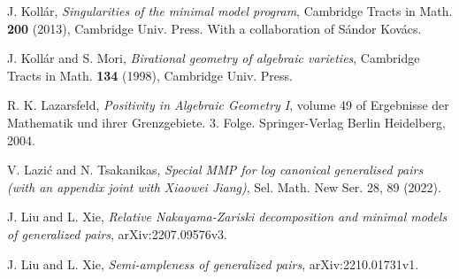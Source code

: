 \documentclass[11pt]{amsart}
\numberwithin{equation}{section}
\theoremstyle{definition}
\theoremstyle{definition}
\theoremstyle{definition}
\begin{document}
\begin{thebibliography}{ABCDE}
 J. Koll\'ar, \textit{Singularities of the minimal model program}, Cambridge Tracts in Math. \textbf{200} (2013), Cambridge Univ. Press. With a collaboration of S\'andor Kov\'acs.

 J. Koll\'{a}r and S. Mori, \textit{Birational geometry of algebraic varieties}, Cambridge Tracts in Math. \textbf{134} (1998), Cambridge Univ. Press.

R. K. Lazarsfeld, \textit{ Positivity in Algebraic Geometry I}, volume 49 of Ergebnisse der Mathematik
und ihrer Grenzgebiete. 3. Folge. Springer-Verlag Berlin Heidelberg, 2004.

 V. Lazi\'c and N. Tsakanikas, \textit{Special MMP for log canonical generalised pairs (with an appendix joint with Xiaowei Jiang)},  Sel. Math. New Ser. 28, 89 (2022).

 J. Liu and L. Xie, \textit{Relative Nakayama-Zariski decomposition and minimal models of generalized pairs}, arXiv:2207.09576v3.

 J. Liu and L. Xie, \textit{Semi-ampleness of generalized pairs}, arXiv:2210.01731v1.

\end{thebibliography}
\end{document}
